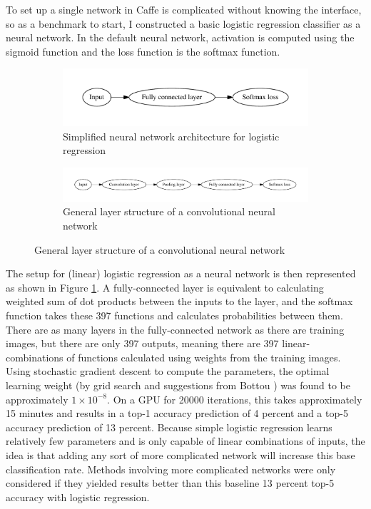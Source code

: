 \documentclass[10pt]{article}
\begin{document}
To set up a single network in Caffe is complicated without knowing the interface, so as a benchmark to start, I constructed a basic logistic regression classifier as a neural network. In the default neural network, activation is computed using the sigmoid function and the loss function is the softmax function.

\begin{figure}[!ht]
\centering
\begin{subfigure}[b]{0.5\textwidth}
	\centering
	\includegraphics[width=\textwidth]{logreg.pdf}
	\caption{Simplified neural network architecture for logistic regression}
	\label{fig:logregnn}
\end{subfigure}
\begin{subfigure}[b]{0.8\textwidth}
	\centering
	\includegraphics[width=\textwidth]{generalcnn.pdf}
	\caption{General layer structure of a convolutional neural network}
	\label{fig:generalcnn}
\end{subfigure}
\end{figure}

The setup for (linear) logistic regression as a neural network is then represented as shown in Figure \ref{fig:logregnn}. A fully-connected layer is equivalent to calculating weighted sum of dot products between the inputs to the layer, and the softmax function takes these 397 functions and calculates probabilities between them. There are as many layers in the fully-connected network as there are training images, but there are only 397 outputs, meaning there are 397 linear-combinations of functions calculated using weights from the training images. Using stochastic gradient descent to compute the parameters, the optimal learning weight (by grid search and suggestions from Bottou \cite{bottou_large-scale_2010}) was found to be approximately $1 \times 10^{-8}$. On a GPU for 20000 iterations, this takes approximately 15 minutes and results in a top-1 accuracy prediction of 4 percent and a top-5 accuracy prediction of 13 percent. Because simple logistic regression learns relatively few parameters and is only capable of linear combinations of inputs, the idea is that adding any sort of more complicated network will increase this base classification rate. Methods involving more complicated networks were only considered if they yielded results better than this baseline 13 percent top-5 accuracy with logistic regression. 
\end{document}
